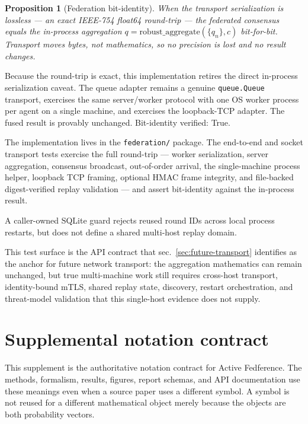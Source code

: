 \documentclass[
  english,
]{article}
\theoremstyle{plain}
\newtheorem{proposition}[theorem]{Proposition}
\theoremstyle{definition}
\theoremstyle{remark}
\theoremstyle{definition}
\begin{document}
\begin{proposition}[Federation bit-identity]\label{prop:federation-bit-identity}
When the transport serialization is lossless — an exact IEEE-754 float64
round-trip — the federated consensus equals the in-process aggregation
\(q = \mathrm{robust\_aggregate}(\{q_n\}, c)\) bit-for-bit. Transport moves
bytes, not mathematics, so no precision is lost and no result changes.
\end{proposition}

Because the round-trip is exact, this implementation retires the direct
in-process serialization caveat. The queue adapter remains a genuine
\texttt{queue.Queue} transport, 
exercises the same server/worker protocol with one OS worker process per
agent on a single machine, and  exercises the
loopback-TCP adapter. The fused result is provably unchanged.
Bit-identity verified: True.

The implementation lives in the \texttt{federation/} package. The
end-to-end and socket transport tests exercise the full round-trip ---
worker serialization, server aggregation, consensus broadcast,
out-of-order arrival, the single-machine process helper, loopback TCP
framing, optional HMAC frame integrity, and file-backed digest-verified
replay validation --- and assert bit-identity against the in-process
 result.

A caller-owned SQLite guard rejects reused round IDs across local
process restarts, but does not define a shared multi-host replay domain.

This test surface is the API contract that
sec.~\ref{sec:future-transport} identifies as the anchor for future
network transport: the aggregation mathematics can remain unchanged, but
true multi-machine work still requires cross-host transport,
identity-bound mTLS, shared replay state, discovery, restart
orchestration, and threat-model validation that this single-host
evidence does not supply.

\section{Supplemental notation contract}\label{sec:supp-notation}

This supplement is the authoritative notation contract for Active
Fedference. The methods, formalism, results, figures, report schemas,
and API documentation use these meanings even when a source paper uses a
different symbol. A symbol is not reused for a different mathematical
object merely because the objects are both probability vectors.
\end{document}
